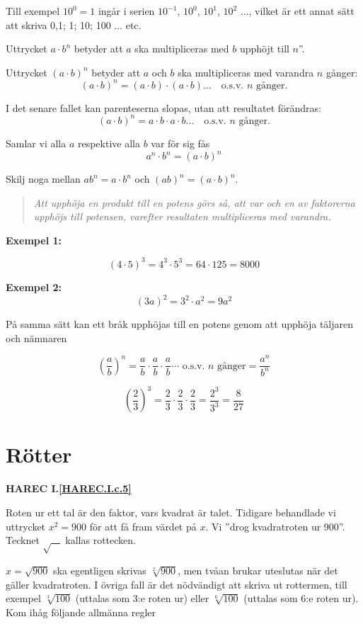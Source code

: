 Till exempel \(10^0 = 1\) ingår i serien \(10^{-1}\), \(10^0\), \(10^1\), \(10^2\)
\(\ldots\), vilket är ett annat sätt att skriva 0,1; 1; 10; 100 \(\ldots\) etc.

Uttrycket \(a \cdot b^n\) betyder att \(a\) ska multipliceras med \(b\) upphöjt
till \(n\)''.

Uttrycket \((a \cdot b)^n\) betyder att \(a\) och \(b\) ska multipliceras med
varandra \(n\) gånger:
\[
(a \cdot b)^n = (a \cdot b) \cdot (a \cdot b) \ldots
\quad \text{o.s.v. }n\text{ gånger.}
\]

I det senare fallet kan parenteserna slopas, utan att resultatet förändras:
\[
(a \cdot b)^n = a \cdot b \cdot a \cdot b \ldots
\quad \text{o.s.v. }n\text{ gånger.}
\]

Samlar vi alla \(a\) respektive alla \(b\) var för sig fås
\[a^n \cdot b^n = (a \cdot b)^n\]

Skilj noga mellan \(ab^n = a \cdot b^n\) och \((ab)^n = (a \cdot b)^n\).

\begin{quote}\emph{
Att upphöja en produkt till en potens görs så, att var och en av faktorerna
upphöjs till potensen, varefter resultaten multipliceras med varandra.
}\end{quote}

\textbf{Exempel 1:}

\[
(4 \cdot 5)^3 = 4^3 \cdot 5^3 = 64 \cdot 125 = 8000
\]

\textbf{Exempel 2:}
\[
(3a)^2 = 3^2 \cdot a^2 = 9a^2
\]

På samma sätt kan ett bråk upphöjas till en potens genom att upphöja täljaren
och nämnaren

\[
\left(\frac{a}{b}\right)^n =
\frac{a}{b} \cdot \frac{a}{b} \cdot \frac{a}{b} \cdots
\text{ o.s.v. }n\text{ gånger}
= \frac{a^n}{b^n}
\]

\[
\left(\frac{2}{3}\right)^3 = \frac{2}{3} \cdot \frac{2}{3} \cdot \frac{2}{3} =
\frac{2^3}{3^3} = \frac{8}{27}
\]

\section{Rötter}
\textbf{HAREC I.\ref{HAREC.I.c.5}\label{myHAREC.I.c.5}}

Roten ur ett tal är den faktor, vars kvadrat är talet.
Tidigare behandlade vi uttrycket \(x^2 = 900\) för att få fram värdet på \(x\).
Vi ''drog kvadratroten ur 900''.
Tecknet \(\sqrt{\ \ \ \ }\) kallas rottecken.

\(x = \sqrt{900}\) ska egentligen skrivas \(\sqrt[2]{900}\),
men tvåan brukar uteslutas när det gäller kvadratroten.
I övriga fall är det nödvändigt att skriva ut rottermen, till exempel
\(\sqrt[3]{100}\) (uttalas som 3:e roten ur) eller \(\sqrt[6]{100}\)
(uttalas som 6:e roten ur).
Kom ihåg följande allmänna regler

